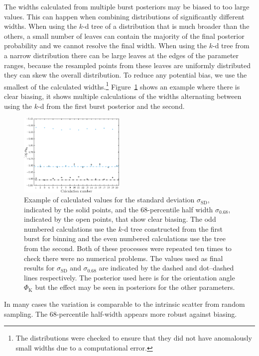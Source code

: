 \documentclass[useAMS,usedcolumn,usegraphicx,usenatbib]{mn2e}
\newcommand{\Figref}[1]{Figure~\ref{fig:#1}}
\newcommand{\sub}[1]{\ensuremath{_\mathrm{#1}}}
\begin{document}
The widths calculated from multiple burst posteriors may be biased to too large values. This can happen when combining distributions of significantly different widths. When using the $k$-d tree of a distribution that is much broader than the others, a small number of leaves can contain the majority of the final posterior probability and we cannot resolve the final width. When using the $k$-d tree from a narrow distribution there can be large leaves at the edges of the parameter ranges, because the resampled points from these leaves are uniformly distributed they can skew the overall distribution. To reduce any potential bias, we use the smallest of the calculated widths.\footnote{The distributions were checked to ensure that they did not have anomalously small widths due to a computational error.} \Figref{bias} shows an example where there is clear biasing, it shows multiple calculations of the widths alternating between using the $k$-d from the first burst posterior and the second.
\begin{figure}
\begin{center}
   \includegraphics[width=0.45\textwidth]{Fig_bias_sigma_4_85}
\caption{Example of calculated values for the standard deviation $\sigma\sub{SD}$, indicated by the solid points, and the $68$-percentile half width $\sigma\sub{0.68}$, indicated by the open points, that show clear biasing. The odd numbered calculations use the $k$-d tree constructed from the first burst for binning and the even numbered calculations use the tree from the second. Both of these processes were repeated ten times to check there were no numerical problems. The values used as final results for $\sigma\sub{SD}$ and $\sigma\sub{0.68}$ are indicated by the dashed and dot--dashed lines respectively. The posterior used here is for the orientation angle $\Phi\sub{K}$ but the effect may be seen in posteriors for the other parameters.\label{fig:bias}}
  \end{center}
\end{figure}
In many cases the variation is comparable to the intrinsic scatter from random sampling. The $68$-percentile half-width appears more robust against biasing.
\end{document}
